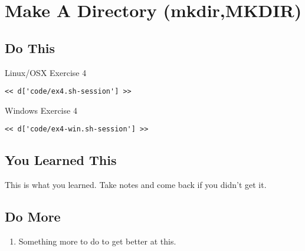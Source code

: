 \chapter{Make A Directory (mkdir,MKDIR)}

\section{Do This}

\begin{code}{Linux/OSX Exercise 4}
\begin{Verbatim}
<< d['code/ex4.sh-session'] >>
\end{Verbatim}
\end{code}

\begin{code}{Windows Exercise 4}
\begin{Verbatim}
<< d['code/ex4-win.sh-session'] >>
\end{Verbatim}
\end{code}

\section{You Learned This}

This is what you learned.  Take notes and come back if you didn't get it.

\section{Do More}

\begin{enumerate}
\item Something more to do to get better at this.
\end{enumerate}

